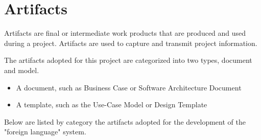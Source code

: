 \documentclass[11pt, twoside, a4paper]{book}
\begin{document}

			\section{Artifacts}
			
				Artifacts are final or intermediate work products that are produced and used during a project. Artifacts are used to capture and transmit project information.

				The artifacts adopted for this project are categorized into two types, document and model.
				
				\begin{itemize}
					\item A document, such as Business Case or Software Architecture Document 
					\item A template, such as the Use-Case Model or Design Template
				\end{itemize}
				
				Below are listed by category the artifacts adopted for the development of the "foreign language" system.
			
\end{document}
